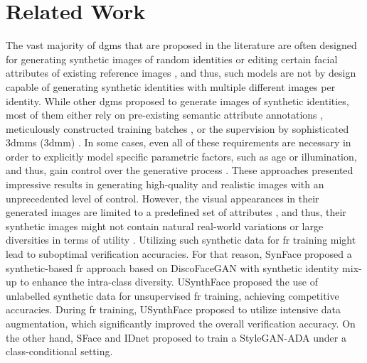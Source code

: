 \documentclass[10pt,twocolumn,letterpaper]{article}
\begin{document}
\vspace{-3mm}
\section{Related Work}
\vspace{-1mm}
The vast majority of \acrshort{dgm}s that are proposed in the literature are often designed for generating synthetic images of random identities \cite{Goodfellow2014,Karras2017,Karras2018,IVC_Syn} or editing certain facial attributes of existing reference images \cite{Tran2019,Shen2018FaceFeatGAN,Shen2020,Tewari2020}, and thus, such models are not by design capable of generating synthetic identities with multiple different images per identity.
While other \acrshort{dgm}s proposed to generate images of synthetic identities, most of them either rely on pre-existing semantic attribute annotations \cite{Tran2019,Shen2018,Shen2018FaceFeatGAN,Shen2020,Deng2020,Kowalski2020,Ghosh2020,Shoshan2021,Tewari2020}, meticulously constructed training batches \cite{Donahue2017,Deng2020,Shoshan2021}, or the supervision by sophisticated \acrlong{3dmm}s (\acrshort{3dmm}) \cite{Shen2018, Shen2018FaceFeatGAN,Deng2020,Kowalski2020,Ghosh2020,Tewari2020}. In some cases, even all of these requirements are necessary in order to explicitly model specific parametric factors, such as age or illumination, and thus, gain control over the generative process \cite{Deng2020}. 
These approaches presented impressive results in generating high-quality and realistic images \cite{Deng2020,Shoshan2021} with an unprecedented level of control. However, the visual appearances in their generated images are limited to a predefined set of attributes \cite{Deng2020,Shoshan2021}, and thus, their synthetic images might not contain natural real-world variations or large diversities in terms of utility \cite{DBLP:conf/iwbf/FuKBD23}. Utilizing such synthetic data for \acrshort{fr} training might lead to suboptimal verification accuracies. For that reason, SynFace \cite{Qiu2021} proposed a synthetic-based \acrshort{fr} approach based on DiscoFaceGAN \cite{Deng2020} with synthetic identity mix-up to enhance the intra-class diversity. 
USynthFace \cite{FBoutros2022USynthFace} proposed the use of unlabelled synthetic data for unsupervised \acrshort{fr} training, achieving competitive accuracies.
During \acrshort{fr} training, USynthFace \cite{FBoutros2022USynthFace} proposed to utilize intensive data augmentation, which significantly improved the overall verification accuracy.
On the other hand, SFace \cite{Boutros2022SFace} and IDnet \cite{IDnet} proposed to train a StyleGAN-ADA \cite{Karras2020StyleGANADA} under a class-conditional setting. 
\end{document}
